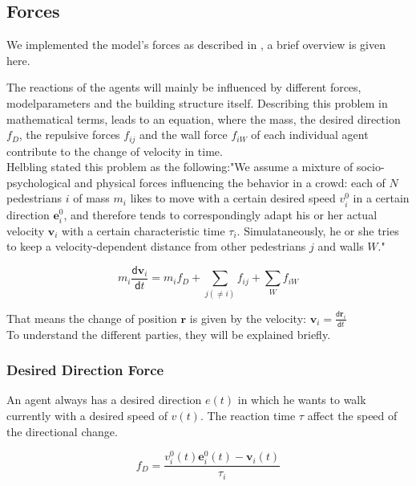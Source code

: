\documentclass[11pt]{article}
\begin{document}
\subsection {Forces}

We implemented the model's forces as described in \cite{SDFEP}, a brief overview is given here.

The reactions of the agents will mainly be influenced by different forces, modelparameters and the building structure itself.
Describing this problem in mathematical terms, leads to an equation, where the mass, the desired direction $f_{D}$, the repulsive forces $f_{ij}$ and the wall force $f_{iW}$ of each individual agent contribute to the change of velocity in time.\\
Helbling stated this problem as the following:"We assume a mixture of socio-psychological and physical forces influencing the behavior in a crowd: each of $N$ pedestrians $i$ of mass $m_{i}$ likes to move with a certain desired speed $v_{i}^0$ in a certain direction $\mathbf{e}_{i}^0$, and therefore tends to correspondingly adapt his or her actual velocity $\mathbf{v}_i$ with a certain characteristic time $\tau_{i}$. Simulataneously, he or she tries to keep a velocity-dependent distance from other pedestrians $j$ and walls $W$."

\begin{equation}
m_{i}\frac{\mathsf{d}\mathbf{v}_{i}}{\mathsf{d}t}=m_{i}f_{D}+\sum \limits_{j(\neq{i})}{f_{ij}}+\sum \limits_{W}{f_{iW}}
\end{equation}

That means the change of position $\mathbf{r}$ is given by the velocity: $\mathbf{v}_{i}=\frac{\mathsf{d}\mathbf{r}_{i}}{\mathsf{d}t}$\\
To understand the different parties, they will be explained briefly.

\subsubsection{Desired Direction Force}

An agent always has a desired direction $e(t)$ in which he wants to walk currently with a desired speed of $v(t)$. 
The reaction time $\tau$ affect the speed of the directional change.

\begin{equation}
f_{D}=\frac{v_{i}^{0}(t)\mathbf{e}_{i}^{0}(t)-\mathbf{v}_{i}(t)}{\tau_{i}}
\end{equation}
\end{document}
